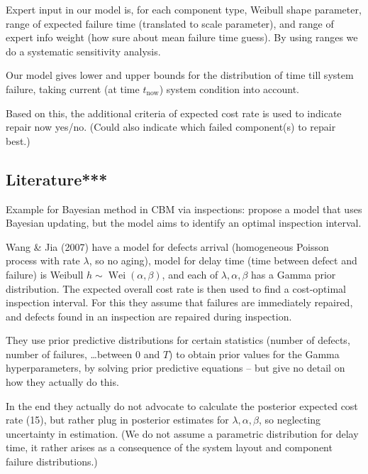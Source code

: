 \documentclass[authoryear]{elsarticle}
\newcommand{\wei}{\operatorname{Wei}} %
\def\tnow{t_\text{now}}
\begin{document}
Expert input in our model is, for each component type,
Weibull shape parameter, range of expected failure time (translated to scale parameter),
and range of expert info weight (how sure about mean failure time guess).
By using ranges we do a systematic sensitivity analysis.

Our model gives lower and upper bounds for the distribution of time till system failure,
taking current (at time $\tnow$) system condition into account.

Based on this, the additional criteria of expected cost rate is used to indicate repair now yes/no.
(Could also indicate which failed component(s) to repair best.)


\subsection{Literature***}

Example for Bayesian method in CBM via inspections: \cite{2007:wang-jia}
propose a model that uses Bayesian updating,
but the model aims to identify an optimal inspection interval.

\begin{scriptsize}
Wang \& Jia (2007) have a model for defects arrival (homogeneous Poisson process with rate $\lambda$, so no aging),
model for delay time (time between defect and failure) is Weibull $h \sim \wei(\alpha,\beta)$,
and each of $\lambda, \alpha, \beta$ has a Gamma prior distribution.
The expected overall cost rate is then used to find a cost-optimal inspection interval.
For this they assume that failures are immediately repaired,
and defects found in an inspection are repaired during inspection.

They use prior predictive distributions for certain statistics (number of defects, number of failures, \ldots between $0$ and $T$)
to obtain prior values for the Gamma hyperparameters,
by solving prior predictive equations -- but give no detail on how they actually do this.

In the end they actually do not advocate to calculate the posterior expected cost rate (15),
but rather plug in posterior estimates for $\lambda, \alpha, \beta$,
so neglecting uncertainty in estimation.
(We do not assume a parametric distribution for delay time,
it rather arises as a consequence of the system layout and component failure distributions.)

\end{scriptsize}
\end{document}
